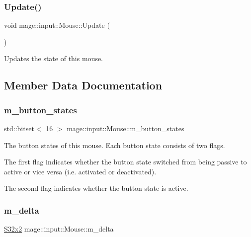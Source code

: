 \subsubsection{\texorpdfstring{Update()}{Update()}}
{\footnotesize\ttfamily void mage\+::input\+::\+Mouse\+::\+Update (\begin{DoxyParamCaption}{ }\end{DoxyParamCaption})\hspace{0.3cm}{\ttfamily [noexcept]}}

Updates the state of this mouse. 

\subsection{Member Data Documentation}
\mbox{\label{classmage_1_1input_1_1_mouse_a7a11cd8de9e8dda4ef40c31670b04b00}} 
\subsubsection{\texorpdfstring{m\+\_\+button\+\_\+states}{m\_button\_states}}
{\footnotesize\ttfamily std\+::bitset$<$ 16 $>$ mage\+::input\+::\+Mouse\+::m\+\_\+button\+\_\+states\hspace{0.3cm}{\ttfamily [private]}}

The button states of this mouse. Each button state consists of two flags.

The first flag indicates whether the button state switched from being passive to active or vice versa (i.\+e. activated or deactivated).

The second flag indicates whether the button state is active. \mbox{\label{classmage_1_1input_1_1_mouse_ac2e7872b793012d52c9f1b1b1206f6d6}} 
\subsubsection{\texorpdfstring{m\+\_\+delta}{m\_delta}}
{\footnotesize\ttfamily \mbox{\hyperlink{namespacemage_a4843c424aae7bb5fb6c440ed6ed593ee}{S32x2}} mage\+::input\+::\+Mouse\+::m\+\_\+delta\hspace{0.3cm}{\ttfamily [private]}}


